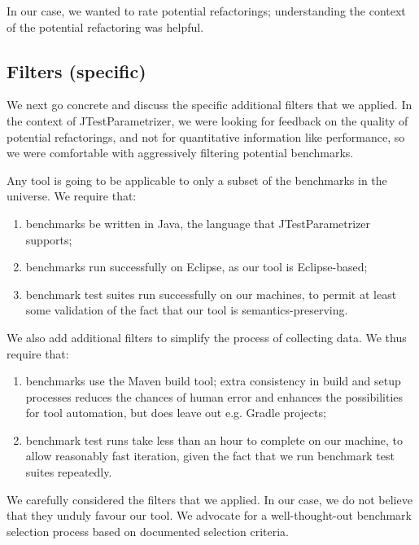 In our case, we wanted to rate potential refactorings; understanding the context of the potential refactoring was helpful.

\subsection{Filters (specific)}
We next go concrete and discuss the specific additional filters that we applied.
In the context of JTestParametrizer, we were looking for feedback on the quality of potential refactorings, and not for quantitative information like performance, so we were comfortable with aggressively filtering potential benchmarks.

Any tool is going to be applicable to only a subset of the benchmarks in the universe. We require that:
\begin{enumerate}
\item benchmarks be written in Java, the language that JTestParametrizer supports;
\item benchmarks run successfully on Eclipse, as our tool is Eclipse-based;
\item benchmark test suites run successfully on our machines, to permit at least some validation of the fact that our tool is semantics-preserving.
\end{enumerate}
We also add additional filters to simplify the process of collecting data. We thus require that:
\begin{enumerate}
\item benchmarks use the Maven build tool; extra consistency in build and setup processes reduces the chances of human error and enhances the possibilities for tool automation, but does leave out e.g. Gradle projects;
\item benchmark test runs take less than an hour to complete on our machine, to allow reasonably fast iteration, given the fact that we run benchmark test suites repeatedly.
\end{enumerate}
We carefully considered the filters that we applied. In our case, we do not believe that they unduly favour our tool. We advocate for a well-thought-out benchmark selection process based on documented selection criteria.

